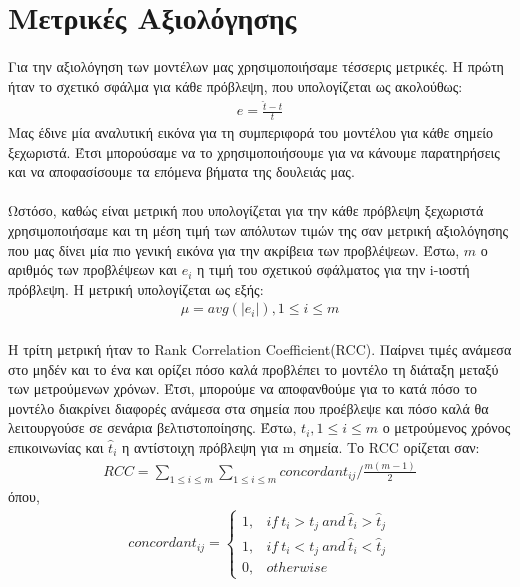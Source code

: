 \section{Μετρικές Αξιολόγησης}
\paragraph{}
Για την αξιολόγηση των μοντέλων μας χρησιμοποιήσαμε τέσσερις μετρικές. Η πρώτη ήταν το σχετικό σφάλμα για κάθε πρόβλεψη, που υπολογίζεται ως ακολούθως:
\begin{align*}
e = \frac{\hat{t}-t}{t}
\end{align*}
Μας έδινε μία αναλυτική εικόνα για τη συμπεριφορά του μοντέλου για κάθε σημείο ξεχωριστά. Έτσι μπορούσαμε να το χρησιμοποιήσουμε για να κάνουμε παρατηρήσεις και να αποφασίσουμε τα επόμενα βήματα της δουλειάς μας.
\paragraph{}
Ωστόσο, καθώς είναι μετρική που υπολογίζεται για την κάθε πρόβλεψη ξεχωριστά χρησιμοποιήσαμε και τη μέση τιμή των απόλυτων τιμών της σαν μετρική αξιολόγησης που μας δίνει μία πιο γενική εικόνα για την ακρίβεια των προβλέψεων. Έστω, $m$ ο αριθμός των προβλέψεων και $e_i$ η τιμή του σχετικού σφάλματος για την i-ιοστή πρόβλεψη. Η μετρική υπολογίζεται ως εξής:
\begin{align*}
\mu = avg(|e_i|), 1\leq i \leq m
\end{align*}
\paragraph{}
Η τρίτη μετρική ήταν το Rank Correlation Coefficient(RCC). Παίρνει τιμές ανάμεσα στο μηδέν και το ένα και ορίζει πόσο καλά προβλέπει το μοντέλο τη διάταξη μεταξύ των μετρούμενων χρόνων. Έτσι, μπορούμε να αποφανθούμε για το κατά πόσο το μοντέλο διακρίνει διαφορές ανάμεσα στα σημεία που προέβλεψε και πόσο καλά θα λειτουργούσε σε σενάρια βελτιστοποίησης. Έστω, $t_i, 1\leq i \leq m$ ο μετρούμενος χρόνος επικοινωνίας και $\hat{t}_i$ η αντίστοιχη πρόβλεψη για m σημεία. Το RCC ορίζεται σαν:
\begin{align*}
RCC = \sum_{1\leq i \leq m} \sum_{1\leq i \leq m} concordant_{ij}/ \frac{m(m-1)}{2}
\end{align*}
όπου,
\begin{align*}
concordant_{ij} = \begin{cases} 
      1, & if \ t_i > t_j \ and \ \hat{t}_i > \hat{t}_j \\
      1, & if \ t_i < t_j \ and \ \hat{t}_i < \hat{t}_j \\
      0, & otherwise  
   \end{cases}
\end{align*}
